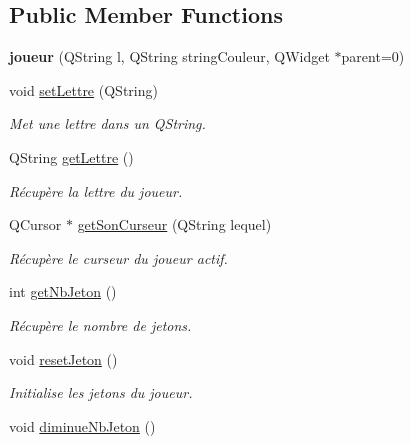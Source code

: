 \subsection*{Public Member Functions}
\begin{DoxyCompactItemize}
\item 
\hypertarget{classjoueur_a9f78a65e07011114967ef5c813a868cb}{{\bfseries joueur} (Q\-String l, Q\-String string\-Couleur, Q\-Widget $\ast$parent=0)}\label{classjoueur_a9f78a65e07011114967ef5c813a868cb}

\item 
\hypertarget{classjoueur_a6095d00e5c84a98694ae3f2ebbef48d8}{void \hyperlink{classjoueur_a6095d00e5c84a98694ae3f2ebbef48d8}{set\-Lettre} (Q\-String)}\label{classjoueur_a6095d00e5c84a98694ae3f2ebbef48d8}

\begin{DoxyCompactList}\small\item\em Met une lettre dans un Q\-String. \end{DoxyCompactList}\item 
\hypertarget{classjoueur_a7a91ed8fa89ad62545bae8e805565c39}{Q\-String \hyperlink{classjoueur_a7a91ed8fa89ad62545bae8e805565c39}{get\-Lettre} ()}\label{classjoueur_a7a91ed8fa89ad62545bae8e805565c39}

\begin{DoxyCompactList}\small\item\em Récupère la lettre du joueur. \end{DoxyCompactList}\item 
\hypertarget{classjoueur_a19403939c10d9a70b6035024978ca230}{Q\-Cursor $\ast$ \hyperlink{classjoueur_a19403939c10d9a70b6035024978ca230}{get\-Son\-Curseur} (Q\-String lequel)}\label{classjoueur_a19403939c10d9a70b6035024978ca230}

\begin{DoxyCompactList}\small\item\em Récupère le curseur du joueur actif. \end{DoxyCompactList}\item 
int \hyperlink{classjoueur_a80aefa29f51995d731605b5230840ac3}{get\-Nb\-Jeton} ()
\begin{DoxyCompactList}\small\item\em Récupère le nombre de jetons. \end{DoxyCompactList}\item 
void \hyperlink{classjoueur_a15c0ea5487cf6800e373cb1b1ed52b12}{reset\-Jeton} ()
\begin{DoxyCompactList}\small\item\em Initialise les jetons du joueur. \end{DoxyCompactList}\item 
\hypertarget{classjoueur_a1a1b8731c7eec4f854a65d83c3f6fc70}{void \hyperlink{classjoueur_a1a1b8731c7eec4f854a65d83c3f6fc70}{diminue\-Nb\-Jeton} ()}\label{classjoueur_a1a1b8731c7eec4f854a65d83c3f6fc70}


\end{DoxyCompactItemize}
